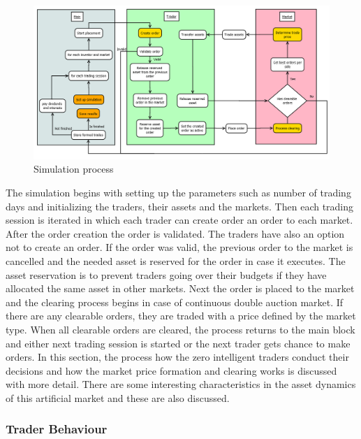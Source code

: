 \begin{figure}
    \includegraphics[width=\linewidth]{diagrams/placement_clearing_process.png}
    \caption{Simulation process}
    \label{fig:sim_proc}
\end{figure}

The simulation begins with setting up the parameters such as number of
trading days and initializing the traders, their assets and the markets.
Then each trading session is iterated in which each trader can create order 
an order to each market. After the order creation the order is validated.
The traders have also an option not to create an order. If the order was
valid, the previous order to the market is cancelled and the needed 
asset is reserved for the order in case it executes. The asset
reservation is to prevent traders going over their budgets if they
have allocated the same asset in other markets. Next the order is
placed to the market and the clearing process begins in case of 
continuous double auction market. If there are any clearable orders,
they are traded with a price defined by the market type. When
all clearable orders are cleared, the process returns to the
main block and either next trading session is started or the next
trader gets chance to make orders. In this section, the process how the
zero intelligent traders conduct their decisions and how the 
market price formation and clearing works is discussed with more detail.
There are some interesting characteristics in the asset dynamics of this
artificial market and these are also discussed.

\subsubsection{Trader Behaviour}

